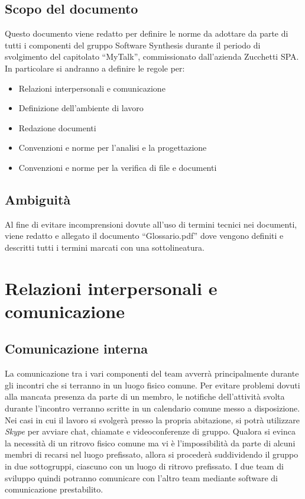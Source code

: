 \subsection{Scopo del documento}
Questo documento viene redatto per definire le norme da adottare da parte di tutti i componenti del gruppo Software Synthesis durante il periodo di svolgimento del capitolato ``MyTalk'', commissionato dall'azienda Zucchetti SPA. In particolare si andranno a definire le regole per:
\begin{itemize}
\item Relazioni interpersonali e comunicazione
\item Definizione dell'ambiente di lavoro
\item Redazione documenti
\item Convenzioni e norme per l'analisi e la progettazione
\item Convenzioni e norme per la verifica di file e documenti
\end{itemize}

\subsection{Ambiguità}
Al fine di evitare incomprensioni dovute all'uso di termini tecnici nei documenti, viene redatto e allegato il documento ``Glossario.pdf'' dove vengono definiti e descritti tutti i termini marcati con una sottolineatura.

\newpage
\section{Relazioni interpersonali e comunicazione}
\subsection{Comunicazione interna}
\label{sec:comunicazione_interna}
La comunicazione tra i vari componenti del team avverrà principalmente durante gli incontri che si terranno in un luogo fisico comune. Per evitare problemi dovuti alla mancata presenza da parte di un membro, le notifiche dell'attività svolta durante l'incontro verranno scritte in un calendario comune messo a disposizione.
Nei casi in cui il lavoro si svolgerà presso la propria abitazione, si potrà utilizzare \textit{Skype} per avviare chat, chiamate e videoconferenze di gruppo.
Qualora si evinca la necessità di un ritrovo fisico comune ma vi è l'impossibilità da parte di alcuni membri di recarsi nel luogo prefissato, allora si procederà suddividendo il gruppo in due sottogruppi, ciascuno con un luogo di ritrovo prefissato. I due team di sviluppo quindi potranno comunicare con l'altro team mediante software di comunicazione prestabilito.


